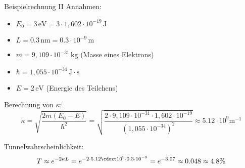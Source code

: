 \documentclass{beamer}
\begin{document}
    \begin{frame}{Beispielrechnung II}
        Annahmen:
        \begin{itemize}
            \item \( E_0 = 3 \, \text{eV} = 3 \cdot 1,602 \cdot 10^{-19} \, \text{J} \)
            \item \( L = 0.3 \, \text{nm} = 0.3 \cdot 10^{-9} \, \text{m} \)
            \item \( m = 9,109 \cdot 10^{-31} \, \text{kg} \) (Masse eines Elektrons)
            \item \( \hbar = 1,055 \cdot 10^{-34} \, \text{J} \cdot \text{s} \)
            \item \( E = 2 \, \text{eV} \) (Energie des Teilchens)
        \end{itemize}

        Berechnung von \( \kappa \):
        \[
            \kappa = \sqrt{\frac{2m(E_0 - E)}{\hbar^2}} = \sqrt{\frac{2 \cdot 9,109 \cdot 10^{-31} \cdot 1,602 \cdot 10^{-19}}{(1,055 \cdot 10^{-34})^2}} \approx 5.12 \cdot 10^9\text{m}^{-1}
        \]

        Tunnelwahrscheinlichkeit:
        \[
            T \approx e^{-2\kappa L} = e^{-2 \cdot 5.12 \cdoxt 10^9 \cdot 0.3 \cdot 10^{-9}} = e^{-3.07} \approx 0.048 \approx 4.8\%
        \]
    \end{frame}
\end{document}
